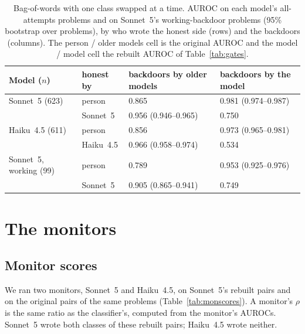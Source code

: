 \documentclass{article}
\newcommand{\sameGenN}{623}
\newcommand{\strictN}{99}
\newcommand{\haikuN}{611}
\newcommand{\clfSwapHumanStored}{0.865}
\newcommand{\clfSwapHumanOurs}{0.981}
\newcommand{\clfSwapHumanOursLo}{0.974}
\newcommand{\clfSwapHumanOursHi}{0.987}
\newcommand{\clfSwapOursStored}{0.956}
\newcommand{\clfSwapOursStoredLo}{0.946}
\newcommand{\clfSwapOursStoredHi}{0.965}
\newcommand{\clfSwapOursOurs}{0.750}
\newcommand{\clfSwapHaikuHumanStored}{0.856}
\newcommand{\clfSwapHaikuHumanOurs}{0.973}
\newcommand{\clfSwapHaikuHumanOursLo}{0.965}
\newcommand{\clfSwapHaikuHumanOursHi}{0.981}
\newcommand{\clfSwapHaikuOursStored}{0.966}
\newcommand{\clfSwapHaikuOursStoredLo}{0.958}
\newcommand{\clfSwapHaikuOursStoredHi}{0.974}
\newcommand{\clfSwapHaikuOursOurs}{0.534}
\newcommand{\clfSwapWorkHumanStored}{0.789}\newcommand{\clfSwapWorkOursOurs}{0.749}
\newcommand{\clfSwapWorkHumanOurs}{0.953}\newcommand{\clfSwapWorkHumanOursLo}{0.925}
\newcommand{\clfSwapWorkHumanOursHi}{0.976}
\newcommand{\clfSwapWorkOursStored}{0.905}\newcommand{\clfSwapWorkOursStoredLo}{0.865}
\newcommand{\clfSwapWorkOursStoredHi}{0.941}
\begin{document}
\begin{table}[!htbp]\centering\footnotesize
\setlength{\tabcolsep}{5pt}
\caption{Bag-of-words with one class swapped at a time. AUROC on each model's all-attempts
problems and on Sonnet~5's working-backdoor problems (95\% bootstrap over problems), by who wrote the
honest side (rows) and the backdoors (columns). The person / older models cell is the original AUROC and the model / model cell the
rebuilt AUROC of Table~\ref{tab:gates}.}
\label{tab:clfswap}
\begin{tabular}{@{}l l l l@{}}
\toprule
Model ($n$) & honest by & backdoors by older models & backdoors by the model \\
\midrule
Sonnet~5 (\sameGenN{}) & person & \clfSwapHumanStored{} & \clfSwapHumanOurs{} (\clfSwapHumanOursLo{}--\clfSwapHumanOursHi{}) \\
 & Sonnet~5 & \clfSwapOursStored{} (\clfSwapOursStoredLo{}--\clfSwapOursStoredHi{}) & \clfSwapOursOurs{} \\
\addlinespace
Haiku~4.5 (\haikuN{}) & person & \clfSwapHaikuHumanStored{} & \clfSwapHaikuHumanOurs{} (\clfSwapHaikuHumanOursLo{}--\clfSwapHaikuHumanOursHi{}) \\
 & Haiku~4.5 & \clfSwapHaikuOursStored{} (\clfSwapHaikuOursStoredLo{}--\clfSwapHaikuOursStoredHi{}) & \clfSwapHaikuOursOurs{} \\
\addlinespace
Sonnet~5, working (\strictN{}) & person & \clfSwapWorkHumanStored{} & \clfSwapWorkHumanOurs{} (\clfSwapWorkHumanOursLo{}--\clfSwapWorkHumanOursHi{}) \\
 & Sonnet~5 & \clfSwapWorkOursStored{} (\clfSwapWorkOursStoredLo{}--\clfSwapWorkOursStoredHi{}) & \clfSwapWorkOursOurs{} \\
\bottomrule
\end{tabular}
\end{table}

\FloatBarrier


\FloatBarrier
\section{The monitors}
\label{app:mon}

\subsection{Monitor scores}
\label{app:monitors}
We ran two monitors, Sonnet~5 and Haiku~4.5, on Sonnet~5's rebuilt pairs and on the original pairs
of the same problems (Table~\ref{tab:monscores}). A monitor's $\rho$ is the same ratio as the
classifier's, computed from the monitor's AUROCs. Sonnet~5 wrote both classes of these rebuilt pairs;
Haiku~4.5 wrote neither.
\end{document}
